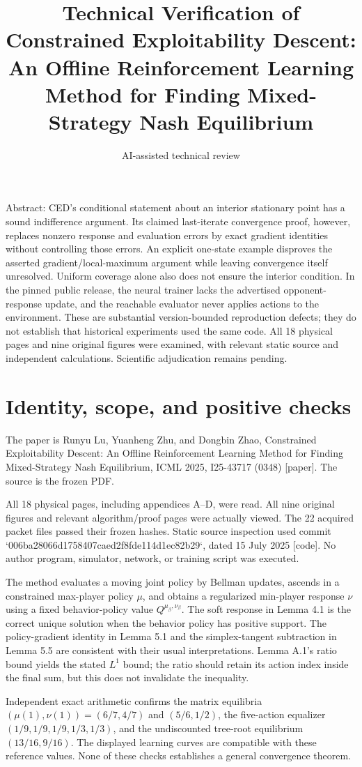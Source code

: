 \documentclass[10pt]{article}
\title{Technical Verification of Constrained Exploitability Descent: An Offline Reinforcement Learning Method for Finding Mixed-Strategy Nash Equilibrium}
\author{AI-assisted technical review}
\date{}
\begin{document}
\maketitle
Abstract: CED’s conditional statement about an interior stationary point has a sound indifference argument. Its claimed last-iterate convergence proof, however, replaces nonzero response and evaluation errors by exact gradient identities without controlling those errors. An explicit one-state example disproves the asserted gradient/local-maximum argument while leaving convergence itself unresolved. Uniform coverage alone also does not ensure the interior condition. In the pinned public release, the neural trainer lacks the advertised opponent-response update, and the reachable evaluator never applies actions to the environment. These are substantial version-bounded reproduction defects; they do not establish that historical experiments used the same code. All 18 physical pages and nine original figures were examined, with relevant static source and independent calculations. Scientific adjudication remains pending.\par
\section*{Identity, scope, and positive checks}
The paper is Runyu Lu, Yuanheng Zhu, and Dongbin Zhao, Constrained Exploitability Descent: An Offline Reinforcement Learning Method for Finding Mixed-Strategy Nash Equilibrium, ICML 2025, I25-43717 (0348) [paper]. The source is the frozen PDF.\par
All 18 physical pages, including appendices A–D, were read. All nine original figures and relevant algorithm/proof pages were actually viewed. The 22 acquired packet files passed their frozen hashes. Static source inspection used commit `006ba28066d1758407caed2f8fde114d1ec82b29`, dated 15 July 2025 [code]. No author program, simulator, network, or training script was executed.\par
The method evaluates a moving joint policy by Bellman updates, ascends in a constrained max-player policy \(\mu\), and obtains a regularized min-player response \(\nu\) using a fixed behavior-policy value \(Q^{\mu_\beta,\nu_\beta}\). The soft response in Lemma 4.1 is the correct unique solution when the behavior policy has positive support. The policy-gradient identity in Lemma 5.1 and the simplex-tangent subtraction in Lemma 5.5 are consistent with their usual interpretations. Lemma A.1’s ratio bound yields the stated \(L^1\) bound; the ratio should retain its action index inside the final sum, but this does not invalidate the inequality.\par
Independent exact arithmetic confirms the matrix equilibria \((\mu(1),\nu(1))=(6/7,4/7)\) and \((5/6,1/2)\), the five-action equalizer \((1/9,1/9,1/9,1/3,1/3)\), and the undiscounted tree-root equilibrium \((13/16,9/16)\). The displayed learning curves are compatible with these reference values. None of these checks establishes a general convergence theorem.\par
\end{document}
